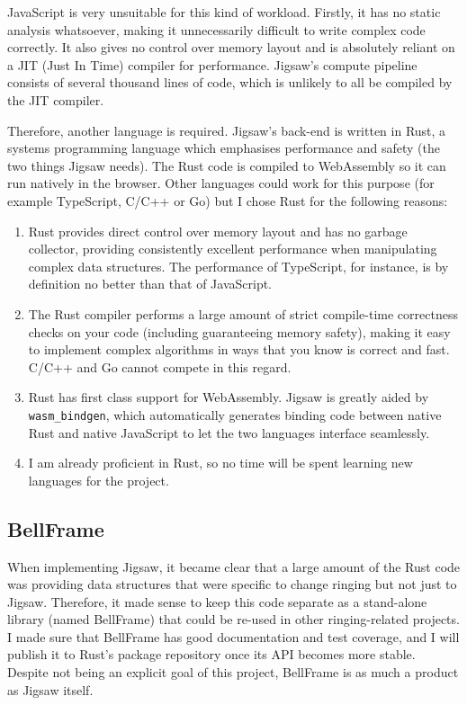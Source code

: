\documentclass[12pt]{article}
\begin{document}
JavaScript is very unsuitable for this kind of workload.  Firstly, it has no static analysis
whatsoever, making it unnecessarily difficult to write complex code correctly.  It also gives no
control over memory layout and is absolutely reliant on a JIT (Just In Time) compiler for
performance.  Jigsaw's compute pipeline consists of several thousand lines of code, which is
unlikely to all be compiled by the JIT compiler.


Therefore, another language is required.  Jigsaw's back-end is written in Rust, a systems
programming language which emphasises performance and safety (the two things Jigsaw needs).  The
Rust code is compiled to WebAssembly so it can run natively in the browser.  Other languages could
work for this purpose (for example TypeScript, C/C++ or Go) but I chose Rust for the following
reasons:

\begin{enumerate}
    \item Rust provides direct control over memory layout and has no garbage collector, providing
        consistently excellent performance when manipulating complex data structures.  The
        performance of TypeScript, for instance, is by definition no better than that of JavaScript.
    \item The Rust compiler performs a large amount of strict compile-time correctness checks on
        your code (including guaranteeing memory safety), making it easy to implement complex
        algorithms in ways that you know is correct and fast.  C/C++ and Go cannot compete in this
        regard.
    \item Rust has first class support for WebAssembly.  Jigsaw is greatly aided by
        \verb|wasm_bindgen|, which automatically generates binding code between native Rust and
        native JavaScript to let the two languages interface seamlessly.
    \item I am already proficient in Rust, so no time will be spent learning new languages for the
        project.
\end{enumerate}

\subsection{BellFrame}

When implementing Jigsaw, it became clear that a large amount of the Rust code was providing data
structures that were specific to change ringing but not just to Jigsaw.  Therefore, it made sense to
keep this code separate as a stand-alone library (named BellFrame) that could be re-used in other
ringing-related projects.  I made sure that BellFrame has good documentation and test coverage, and
I will publish it to Rust's package repository once its API becomes more stable.  Despite not being
an explicit goal of this project, BellFrame is as much a product as Jigsaw itself.
\end{document}
